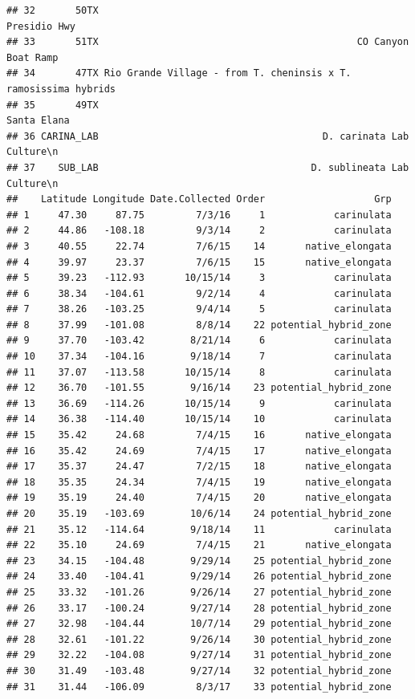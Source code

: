 \documentclass[]{article}
\begin{document}
\begin{verbatim}
## 32       50TX                                                    Presidio Hwy
## 33       51TX                                             CO Canyon Boat Ramp
## 34       47TX Rio Grande Village - from T. cheninsis x T. ramosissima hybrids
## 35       49TX                                                     Santa Elana
## 36 CARINA_LAB                                       D. carinata Lab Culture\n
## 37    SUB_LAB                                     D. sublineata Lab Culture\n
##    Latitude Longitude Date.Collected Order                   Grp
## 1     47.30     87.75         7/3/16     1            carinulata
## 2     44.86   -108.18         9/3/14     2            carinulata
## 3     40.55     22.74         7/6/15    14       native_elongata
## 4     39.97     23.37         7/6/15    15       native_elongata
## 5     39.23   -112.93       10/15/14     3            carinulata
## 6     38.34   -104.61         9/2/14     4            carinulata
## 7     38.26   -103.25         9/4/14     5            carinulata
## 8     37.99   -101.08         8/8/14    22 potential_hybrid_zone
## 9     37.70   -103.42        8/21/14     6            carinulata
## 10    37.34   -104.16        9/18/14     7            carinulata
## 11    37.07   -113.58       10/15/14     8            carinulata
## 12    36.70   -101.55        9/16/14    23 potential_hybrid_zone
## 13    36.69   -114.26       10/15/14     9            carinulata
## 14    36.38   -114.40       10/15/14    10            carinulata
## 15    35.42     24.68         7/4/15    16       native_elongata
## 16    35.42     24.69         7/4/15    17       native_elongata
## 17    35.37     24.47         7/2/15    18       native_elongata
## 18    35.35     24.34         7/4/15    19       native_elongata
## 19    35.19     24.40         7/4/15    20       native_elongata
## 20    35.19   -103.69        10/6/14    24 potential_hybrid_zone
## 21    35.12   -114.64        9/18/14    11            carinulata
## 22    35.10     24.69         7/4/15    21       native_elongata
## 23    34.15   -104.48        9/29/14    25 potential_hybrid_zone
## 24    33.40   -104.41        9/29/14    26 potential_hybrid_zone
## 25    33.32   -101.26        9/26/14    27 potential_hybrid_zone
## 26    33.17   -100.24        9/27/14    28 potential_hybrid_zone
## 27    32.98   -104.44        10/7/14    29 potential_hybrid_zone
## 28    32.61   -101.22        9/26/14    30 potential_hybrid_zone
## 29    32.22   -104.08        9/27/14    31 potential_hybrid_zone
## 30    31.49   -103.48        9/27/14    32 potential_hybrid_zone
## 31    31.44   -106.09         8/3/17    33 potential_hybrid_zone

\end{verbatim}
\end{document}
